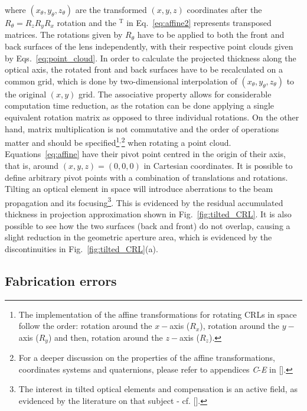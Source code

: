 \begin{refsection}
where $(x_\theta,y_\theta,z_\theta)$ are the transformed $(x,y,z)$ coordinates after the $R_{\theta}=R_zR_yR_x$ rotation and the $^\text{T}$ in Eq.~\ref{eq:affine2} represents transposed matrices. The rotations given by $R_{\theta}$ have to be applied to both the front and back surfaces of the lens independently, with their respective point clouds given by Eqs.~\ref{eq:point_cloud}. In order to calculate the projected thickness along the optical axis, the rotated front and back surfaces have to be recalculated on a common grid, which is done by two-dimensional interpolation of $(x_\theta,y_\theta,z_\theta)$ to the original $(x,y)$ grid. The associative property allows for considerable computation time reduction, as the rotation can be done applying a single equivalent rotation matrix as opposed to three individual rotations. On the other hand, matrix multiplication is not commutative and the order of operations matter and should be specified\footnote{The implementation of the affine transformations for rotating CRLs in space follow the order: rotation around the $x-$axis ($R_x$), rotation around the $y-$axis ($R_y$) and then, rotation around the $z-$axis ($R_z$).}$^{,}$\footnote{For a deeper discussion on the properties of the affine transformations, coordinates systems and quaternions, please refer to appendices \textit{C}-\textit{E} in [\cite{House2016}].} when rotating a point cloud. Equations~\ref{eq:affine} have their pivot point centred in the origin of their axis, that is, around $(x,y,z)=(0,0,0)$ in Cartesian coordinates. It is possible to define arbitrary pivot points with a combination of translations and rotations. Tilting an optical element in space will introduce aberrations to the beam propagation and its focusing\footnote{The interest in tilted optical elements and compensation is an active field, as evidenced by the literature on that subject - cf. [\cite{Guizar-Sicairos2011,Zhou2019,Ali2020}].}. This is evidenced by the residual accumulated thickness in projection approximation shown in Fig.~\ref{fig:tilted_CRL}. It is also possible to see how the two surfaces (back and front) do not overlap, causing a slight reduction in the geometric aperture area, which is evidenced by the discontinuities in Fig.~\ref{fig:tilted_CRL}(a).

\subsection{Fabrication errors}\label{sec:fabrication}


\end{refsection}
